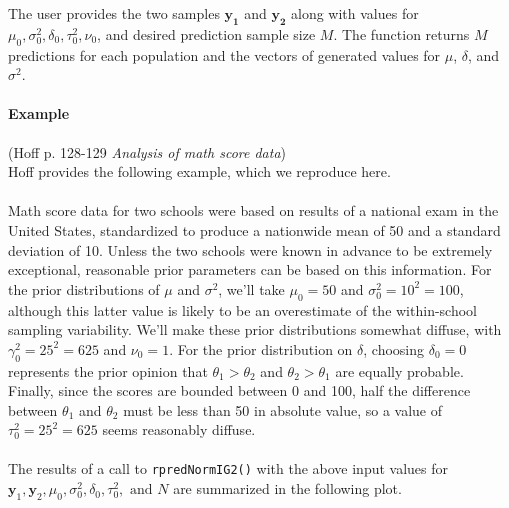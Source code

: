 \documentclass[12pt, a4paper]{article}
\begin{document}
      The user provides the two samples $\mathbf{y_1}$ and $\mathbf{y_2}$ along with values for $\mu_0, \sigma^2_0, \delta_0, \tau^2_0, \nu_0$, and desired prediction sample size $M$.  The function returns $M$ predictions for each population and the vectors of generated values for $\mu$, $\delta$, and $\sigma^2$.

      \paragraph{Example} (Hoff p. 128-129 \textit{Analysis of math score data})\\
      Hoff provides the following example, which we reproduce here.\\\\
      Math score data for two schools were based on results of a national exam in the United States, standardized to produce a nationwide mean of 50 and a standard deviation of 10.  Unless the two schools were known in advance to be extremely exceptional, reasonable prior parameters can be based on this information.  For the prior distributions of $\mu$ and $\sigma^2$, we'll take $\mu_0 = 50$ and $\sigma^2_0 = 10^2 = 100$, although this latter value is likely to be an overestimate of the within-school sampling variability.  We'll make these prior distributions somewhat diffuse, with $\gamma^2_0 = 25^2 = 625$ and $\nu_0 = 1$.  For the prior distribution on $\delta$, choosing $\delta_0 = 0$ represents the prior opinion that $\theta_1 > \theta_2$ and $\theta_2 > \theta_1$ are equally probable.  Finally, since the scores are bounded between 0 and 100, half the difference between $\theta_1$ and $\theta_2$ must be less than 50 in absolute value, so a value of $\tau^2_0 = 25^2 = 625$ seems reasonably diffuse.\\\\
      The results of a call to \texttt{rpredNormIG2()} with the above input values for $\mathbf{y}_1,\mathbf{y}_2,\mu_0,\sigma^2_0,\delta_0,\tau^2_0,\text{ and } N$ are summarized in the following plot.\\
\end{document}
